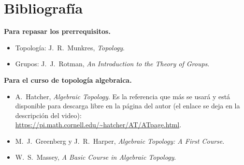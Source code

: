 \documentclass[11pt]{article}
\begin{document}
\section*{Bibliografía}

\noindent\textbf{Para repasar los prerrequisitos.}
\begin{itemize}
  \item Topología: J.\ R.\ Munkres, \emph{Topology}.
  \item Grupos: J.\ J.\ Rotman, \emph{An Introduction to the Theory of Groups}.
\end{itemize}

\noindent\textbf{Para el curso de topología algebraica.}
\begin{itemize}
  \item A.\ Hatcher, \emph{Algebraic Topology}. Es la referencia que más se usará y está disponible para descarga libre en la página del autor (el enlace se deja en la descripción del video):
        \url{https://pi.math.cornell.edu/~hatcher/AT/ATpage.html}.
  \item M.\ J.\ Greenberg y J.\ R.\ Harper, \emph{Algebraic Topology: A First Course}.
  \item W.\ S.\ Massey, \emph{A Basic Course in Algebraic Topology}.
\end{itemize}
\end{document}
